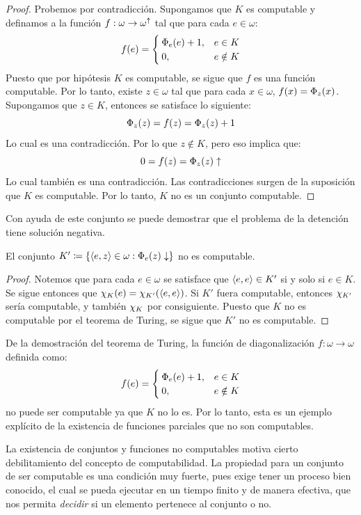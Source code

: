 \begin{proof}
	Probemos por contradicción. Supongamos que $K$ es computable y definamos a la función $f:\omega\to\omega^{\DIVERGE}$ tal que para cada $e\in\omega$:
	\[
		f\pa*{e} =
		\begin{cases}
			\Phi_{e}\pa*{e} + 1, & e\in K\\
			0, & e\notin K
		\end{cases}
	\]
	Puesto que por hipótesis $K$ es computable, se sigue que $f$ es una función computable. Por lo tanto, existe $z\in\omega$ tal que para cada $x\in\omega$, $f\pa*{x} =\Phi_{z}\pa*{x}$. Supongamos que $z\in K$, entonces se satisface lo siguiente:
	\[
		\Phi_{z}\pa*{z} = f\pa*{z} =\Phi_{z}\pa*{z} + 1
	\]
	Lo cual es una contradicción. Por lo que $z\notin K$, pero eso implica que:
	\[
		0 = f\pa*{z} =\Phi_{z}\pa*{z}\DIVERGE
	\]
	Lo cual también es una contradicción. Las contradicciones surgen de la suposición que $K$ es computable. Por lo tanto, $K$ no es un conjunto computable.
\end{proof}

Con ayuda de este conjunto se puede demostrar que el problema de la detención tiene solución negativa.

\begin{coll}
	El conjunto $K'\coloneqq\set*{\inner*{e, z}\in\omega:\Phi_{e}\pa*{z}\ACABA}$ no es computable.
\end{coll}

\begin{proof}
	Notemos que para cada $e\in\omega$ se satisface que $\inner*{e, e}\in K'$ si y solo si $e\in K$. Se sigue entonces que $\CARACTERISTICA{K}\pa*{e} =\CARACTERISTICA{K'}\pa*{\inner*{e, e}}$. Si $K'$ fuera computable, entonces $\CARACTERISTICA{K'}$ sería computable, y también $\CARACTERISTICA{K}$ por consiguiente. Puesto que $K$ no es computable por el teorema de Turing, se sigue que $K'$ no es computable.
\end{proof}

De la demostración del teorema de Turing, la función de diagonalización $f:\omega\to\omega$ definida como:
\[
	f\pa*{e} =
	\begin{cases}
		\Phi_{e}\pa*{e} + 1, & e\in K\\
		0, & e\notin K
	\end{cases}
\]
no puede ser computable ya que $K$ no lo es. Por lo tanto, esta es un ejemplo explícito de la existencia de funciones parciales que no son computables.

La existencia de conjuntos y funciones no computables motiva cierto debilitamiento del concepto de computabilidad. La propiedad para un conjunto de ser computable es una condición muy fuerte, pues exige tener un proceso bien conocido, el cual se pueda ejecutar en un tiempo finito y de manera efectiva, que nos permita \emph{decidir} si un elemento pertenece al conjunto o no.

